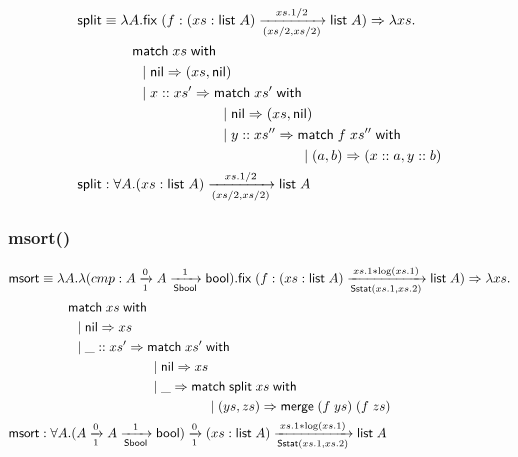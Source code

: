 \documentclass{article}
\newcommand{\arrow}[4]{#1\xrightarrow[#3]{#2}#4}
\newcommand{\symmatch}{\mathsf{match}}
\newcommand{\symwith}{\mathsf{\;with\;}}
\newcommand{\symlist}{\mathsf{list}}
\newcommand{\symnil}{\mathsf{nil}}
\newcommand{\symfix}{\mathsf{fix}}
\newcommand{\symbool}{\mathsf{bool}}
\newcommand{\symmerge}{\mathsf{merge}}
\newcommand{\intro}[2]{(#1 : #2)}
\newcommand{\symSbool}{\mathsf{Sbool}}
\newcommand{\symmsort}{\mathsf{msort}}
\newcommand{\symSstat}{\mathsf{Sstat}}
\newcommand{\symsplit}{\mathsf{split}}
\begin{document}
\begin{align*}
\symsplit &\equiv \lambda A. \symfix\;(f:\arrow{\intro{xs}{\symlist\;A}}{xs.1/2}{(xs/2,xs/2)}{\symlist\;A})\Rightarrow\lambda xs. \\
& \hspace{0.3in} \symmatch\;xs\symwith \\
& \hspace{.4in} |\; \symnil\Rightarrow (xs,\symnil) \\
& \hspace{.4in} |\; x::xs' \Rightarrow \symmatch\;xs'\symwith \\
& \hspace{1.2in} |\; \symnil\Rightarrow (xs,\symnil) \\
& \hspace{1.2in} |\; y::xs'' \Rightarrow \symmatch\; f\;xs'' \symwith \\
& \hspace{2in} |\; (a, b) \Rightarrow (x::a,y::b) \\
\symsplit &: \forall A.\arrow{\intro{xs}{\symlist\;A}}{xs.1/2}{(xs/2,xs/2)}{\symlist\;A}
\end{align*}

\subsubsection{msort()}

\begin{align*}
\symmsort &\equiv \lambda A. \lambda (cmp:\arrow{A}{0}{1}{\arrow{A}{1}{\symSbool}{\symbool}}).\symfix\;(f:\arrow{\intro{xs}{\symlist\;A}}{xs.1*\log(xs.1)}{\symSstat(xs.1,xs.2)}{\symlist\;A})\Rightarrow\lambda xs. \\
& \hspace{0.3in} \symmatch\;xs\symwith \\
& \hspace{.4in} |\; \symnil\Rightarrow xs \\
& \hspace{.4in} |\; \_::xs' \Rightarrow \symmatch\;xs'\symwith \\
& \hspace{1.2in} |\; \symnil\Rightarrow xs \\
& \hspace{1.2in} |\; \_ \Rightarrow \symmatch\; \symsplit\;xs \symwith \\
& \hspace{1.8in} |\; (ys, zs) \Rightarrow \symmerge\;(f\;ys)\;(f\;zs) \\
\symmsort &: \forall A.\arrow{(\arrow{A}{0}{1}{\arrow{A}{1}{\symSbool}{\symbool}})}{0}{1}{\arrow{\intro{xs}{\symlist\;A}}{xs.1*\log(xs.1)}{\symSstat(xs.1,xs.2)}{\symlist\;A}}
\end{align*}
\end{document}
